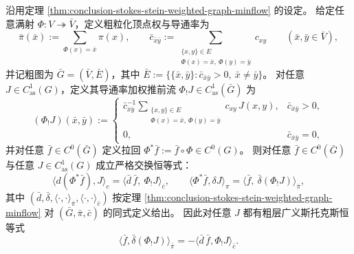 \begin{theorem}\label{thm:conclusion-coarsegraining-stokes-beck-chevalley}
沿用定理 \ref{thm:conclusion-stokes-stein-weighted-graph-minflow} 的设定。
给定任意满射 \(\Phi:V\twoheadrightarrow \bar V\)，定义粗粒化顶点权与导通率为
\[
\bar\pi(\bar x):=\sum_{\Phi(x)=\bar x}\pi(x),
\qquad
\bar c_{\bar x\bar y}:=\sum_{\substack{\{x,y\}\in E\\ \Phi(x)=\bar x,\ \Phi(y)=\bar y}}c_{xy}
\qquad(\bar x,\bar y\in\bar V),
\]
并记粗图为 \(\bar G=(\bar V,\bar E)\)，其中 \(\bar E:=\{\{\bar x,\bar y\}:\bar c_{\bar x\bar y}>0,\ \bar x\neq \bar y\}\)。
对任意 \(J\in C^1_{\mathrm{as}}(G)\)，定义其导通率加权推前流 \(\Phi_!J\in C^1_{\mathrm{as}}(\bar G)\) 为
\[
(\Phi_!J)(\bar x,\bar y):=
\begin{cases}
\bar c_{\bar x\bar y}^{-1}
\displaystyle\sum_{\substack{\{x,y\}\in E\\ \Phi(x)=\bar x,\ \Phi(y)=\bar y}}
c_{xy}\,J(x,y),
&\bar c_{\bar x\bar y}>0,\\[2ex]
0,&\bar c_{\bar x\bar y}=0,
\end{cases}
\]
并对任意 \(\bar f\in C^0(\bar G)\) 定义拉回 \(\Phi^\ast\bar f:=\bar f\circ\Phi\in C^0(G)\)。
则对任意 \(\bar f\in C^0(\bar G)\) 与任意 \(J\in C^1_{\mathrm{as}}(G)\) 成立严格交换恒等式：
\[
\langle d(\Phi^\ast\bar f),J\rangle_c=\langle \bar d\,\bar f,\ \Phi_!J\rangle_{\bar c},
\qquad
\langle \Phi^\ast\bar f,\delta J\rangle_\pi=\langle \bar f,\ \bar\delta(\Phi_!J)\rangle_{\bar\pi},
\]
其中 \((\bar d,\bar\delta,\langle\cdot,\cdot\rangle_{\bar\pi},\langle\cdot,\cdot\rangle_{\bar c})\) 按定理
\ref{thm:conclusion-stokes-stein-weighted-graph-minflow} 对 \((\bar G,\bar\pi,\bar c)\) 的同式定义给出。
因此对任意 \(J\) 都有粗层广义斯托克斯恒等式
\[
\langle \bar f,\bar\delta(\Phi_!J)\rangle_{\bar\pi}=-\langle \bar d\,\bar f,\Phi_!J\rangle_{\bar c}.
\]
\end{theorem}
